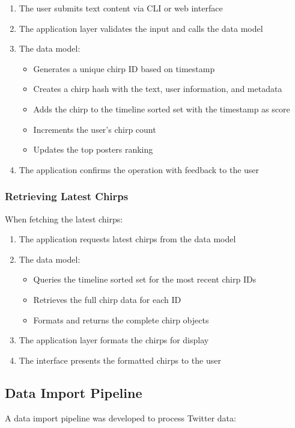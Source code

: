 \documentclass[a4paper,11pt]{article}
\begin{document}
\begin{enumerate}
    \item The user submits text content via CLI or web interface
    \item The application layer validates the input and calls the data model
    \item The data model:
        \begin{itemize}
            \item Generates a unique chirp ID based on timestamp
            \item Creates a chirp hash with the text, user information, and metadata
            \item Adds the chirp to the timeline sorted set with the timestamp as score
            \item Increments the user's chirp count
            \item Updates the top posters ranking
        \end{itemize}
    \item The application confirms the operation with feedback to the user
\end{enumerate}

\subsubsection{Retrieving Latest Chirps}
When fetching the latest chirps:

\begin{enumerate}
    \item The application requests latest chirps from the data model
    \item The data model:
        \begin{itemize}
            \item Queries the timeline sorted set for the most recent chirp IDs
            \item Retrieves the full chirp data for each ID
            \item Formats and returns the complete chirp objects
        \end{itemize}
    \item The application layer formats the chirps for display
    \item The interface presents the formatted chirps to the user
\end{enumerate}

\subsection{Data Import Pipeline}
A data import pipeline was developed to process Twitter data:
\end{document}
